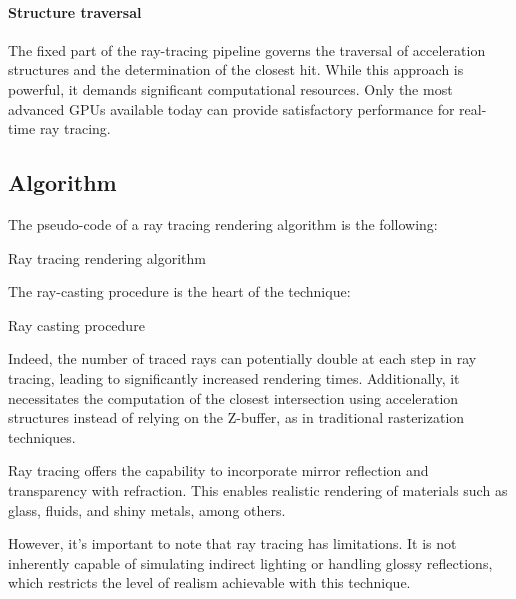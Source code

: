 \paragraph*{Structure traversal}
The fixed part of the ray-tracing pipeline governs the traversal of acceleration structures and the determination of the closest hit. 
While this approach is powerful, it demands significant computational resources. 
Only the most advanced GPUs available today can provide satisfactory performance for real-time ray tracing.

\subsection{Algorithm}
The pseudo-code of a ray tracing rendering algorithm is the following:
\begin{algorithm}[H]
    \caption{Ray tracing rendering algorithm}
        \begin{algorithmic}[1]
            \EndFor{}
        \end{algorithmic}
\end{algorithm}
The ray-casting procedure is the heart of the technique:
\begin{algorithm}[H]
    \caption{Ray casting procedure}
        \begin{algorithmic}[1]
                \EndIf{}
            \EndFor{}
        \end{algorithmic}
\end{algorithm}
Indeed, the number of traced rays can potentially double at each step in ray tracing, leading to significantly increased rendering times. 
Additionally, it necessitates the computation of the closest intersection using acceleration structures instead of relying on the Z-buffer, as in traditional rasterization techniques.

Ray tracing offers the capability to incorporate mirror reflection and transparency with refraction. 
This enables realistic rendering of materials such as glass, fluids, and shiny metals, among others.

However, it's important to note that ray tracing has limitations. 
It is not inherently capable of simulating indirect lighting or handling glossy reflections, which restricts the level of realism achievable with this technique.
